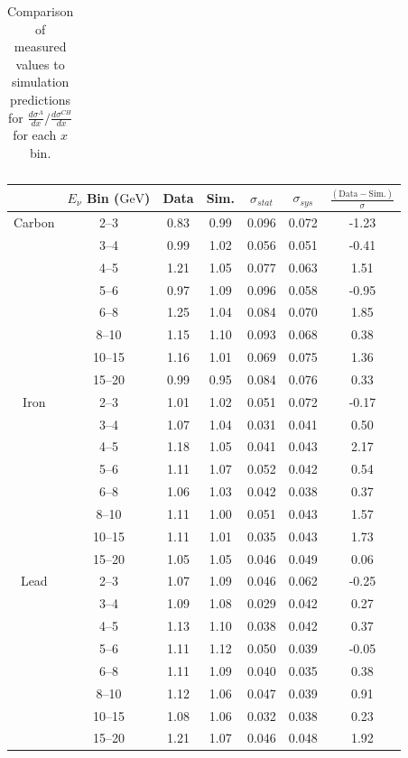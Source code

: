 \documentclass[aps,preprint,showpacs,superscriptaddress]{revtex4} %
\newcommand{\GeV}{\ensuremath{\mbox{GeV}}\xspace}
\newcommand{\Xbj}{\ensuremath{x}\xspace}
\newcommand{\Enu}{\ensuremath{E_{\nu}}\xspace}
\begin{document}
\begin{table}[!ht]
\begin{center}
\begin{tabular}{ccccccc}
      \hline\hline
    \end{tabular}
  \end{center}
  \caption{Comparison of measured values to simulation predictions for $\frac{d\sigma^{A}}{d\Xbj}/\frac{d\sigma^{CH}}{d\Xbj}$ for each \Xbj bin.}
  \label{tab:x_results_table}
\end{table}



\begin{table}[!ht]
\begin{center}
\begin{tabular}{ccccccc}
\hline\hline
& \Enu Bin (\GeV) & Data & Sim. & $\sigma_{stat}$ & $\sigma_{sys}$ & $\frac{(\text{Data}-\text{Sim.})}{\sigma}$ \\ 

\hline
Carbon & 2--3 & 0.83 & 0.99 & 0.096 & 0.072 & -1.23 \\ 
 & 3--4 & 0.99 & 1.02 & 0.056 & 0.051 & -0.41 \\ 
 & 4--5 & 1.21 & 1.05 & 0.077 & 0.063 & 1.51 \\ 
 & 5--6 & 0.97 & 1.09 & 0.096 & 0.058 & -0.95 \\ 
 & 6--8 & 1.25 & 1.04 & 0.084 & 0.070 & 1.85 \\ 
 & 8--10 & 1.15 & 1.10 & 0.093 & 0.068 & 0.38 \\ 
 & 10--15 & 1.16 & 1.01 & 0.069 & 0.075 & 1.36 \\ 
 & 15--20 & 0.99 & 0.95 & 0.084 & 0.076 & 0.33 \\ 

\hline
Iron & 2--3 & 1.01 & 1.02 & 0.051 & 0.072 & -0.17 \\ 
 & 3--4 & 1.07 & 1.04 & 0.031 & 0.041 & 0.50 \\ 
 & 4--5 & 1.18 & 1.05 & 0.041 & 0.043 & 2.17 \\ 
 & 5--6 & 1.11 & 1.07 & 0.052 & 0.042 & 0.54 \\ 
 & 6--8 & 1.06 & 1.03 & 0.042 & 0.038 & 0.37 \\ 
 & 8--10 & 1.11 & 1.00 & 0.051 & 0.043 & 1.57 \\ 
 & 10--15 & 1.11 & 1.01 & 0.035 & 0.043 & 1.73 \\ 
 & 15--20 & 1.05 & 1.05 & 0.046 & 0.049 & 0.06 \\ 

\hline
Lead & 2--3 & 1.07 & 1.09 & 0.046 & 0.062 & -0.25 \\ 
 & 3--4 & 1.09 & 1.08 & 0.029 & 0.042 & 0.27 \\ 
 & 4--5 & 1.13 & 1.10 & 0.038 & 0.042 & 0.37 \\ 
 & 5--6 & 1.11 & 1.12 & 0.050 & 0.039 & -0.05 \\ 
 & 6--8 & 1.11 & 1.09 & 0.040 & 0.035 & 0.38 \\ 
 & 8--10 & 1.12 & 1.06 & 0.047 & 0.039 & 0.91 \\ 
 & 10--15 & 1.08 & 1.06 & 0.032 & 0.038 & 0.23 \\ 
 & 15--20 & 1.21 & 1.07 & 0.046 & 0.048 & 1.92 \\ 


\end{tabular}
\end{center}
\end{table}
\end{document}
